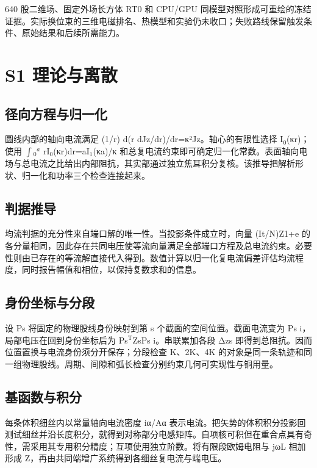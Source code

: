 \documentclass[journal,10pt]{IEEEtran}
\begin{document}
640 股二维场、固定外场长方体 RT0 和 CPU/GPU 同模型对照形成可重绘的冻结证据。实际换位束的三维电磁排名、热模型和实验仍未收口；失败路线保留触发条件、原始结果和后续所需能力。


\FloatBarrier
\section*{S1 理论与离散}
\hypertarget{chapter-S1}{}
\subsection*{径向方程与归一化}
\hypertarget{S1.round_derivation.heading}{}
圆线内部的轴向电流满足 (1/r) d(r dJz/dr)/dr=κ²Jz。轴心的有限性选择 I\(_0\)(κr)；使用 \(\int\)\(_0\)\(^a\) rI\(_0\)(κr)dr=aI\(_1\)(κa)/κ 和总复电流约束即可确定归一化常数。表面轴向电场与总电流之比给出内部阻抗，其实部通过独立焦耳积分复核。该推导把解析形状、归一化和功率三个检查连接起来。


\subsection*{判据推导}
\hypertarget{S1.sharing_derivation.heading}{}
均流判据的充分性来自端口解的唯一性。当投影条件成立时，向量 (It/N)Z1+e 的各分量相同，因此存在共同电压使等流向量满足全部端口方程及总电流约束。必要性则由已存在的等流解直接代入得到。数值计算以归一化复电流偏差评估均流程度，同时报告幅值和相位，以保持复数求和的信息。


\subsection*{身份坐标与分段}
\hypertarget{S1.dtm_derivation.heading}{}
设 Ps 将固定的物理股线身份映射到第 s 个截面的空间位置。截面电流变为 Ps i，局部电压在回到身份坐标后为 Ps\(^{\mathrm T}\)ZsPs i。串联累加各段 Δzs 即得到总阻抗。因而位置置换与电流身份须分开保存；分段检查 K、2K、4K 的对象是同一条轨迹和同一组物理股线。周期、间隙和弧长检查分别约束几何可实现性与铜用量。


\subsection*{基函数与积分}
\hypertarget{S1.peec_derivation.heading}{}
每条体积细丝内以常量轴向电流密度 iα/Aα 表示电流。把矢势的体积积分投影回测试细丝并沿长度积分，就得到对称部分电感矩阵。自项核可积但在重合点具有奇性，需采用其专用积分精度；互项使用独立阶数。将有限段欧姆电阻与 jωL 相加形成 Z，再由共同端增广系统得到各细丝复电流与端电压。
\end{document}
